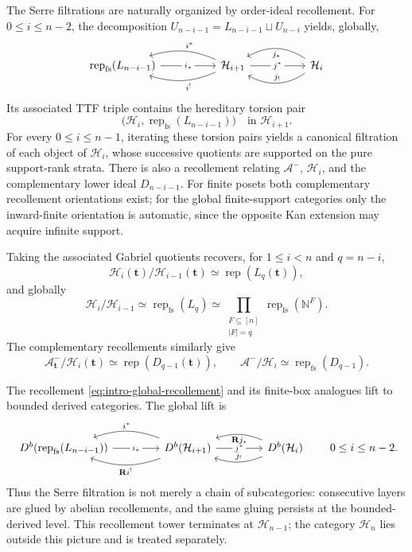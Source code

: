 \documentclass[12pt,reqno]{amsart}
\theoremstyle{definition}
\theoremstyle{remark}
\newcommand{\Rep}{\operatorname{rep}}
\begin{document}
The Serre filtrations are naturally organized by order-ideal recollement.
For $0\le i\le n-2$, the decomposition
$U_{n-i-1}=L_{n-i-1}\sqcup U_{n-i}$ yields, globally,
\begin{equation}\label{eq:intro-global-recollement}
\begin{tikzcd}[column sep=5.0em]
\Rep_{\mathrm{fs}}(L_{n-i-1})
  \arrow[r, "i_*" description]
& \mathcal H_{i+1}
  \arrow[l, bend right=20, "i^*"']
  \arrow[l, bend left=20, "i^!"]
  \arrow[r, "j^*" description]
& \mathcal H_i
  \arrow[l, bend left=32, "j_!"']
  \arrow[l, bend right=32, "j_*"]
\end{tikzcd}
\end{equation}
Its associated TTF triple contains the hereditary torsion pair
\[
\bigl(\mathcal H_i,\Rep_{\mathrm{fs}}(L_{n-i-1})\bigr)
\quad\text{in }\mathcal H_{i+1}.
\]
For every $0\le i\le n-1$, iterating these torsion pairs yields a canonical
filtration of each object of $\mathcal H_i$, whose successive quotients are
supported on the pure support-rank strata.  There is also a recollement relating $\mathcal A^-$,
$\mathcal H_i$, and the complementary lower ideal $D_{n-i-1}$.
For finite posets both complementary recollement orientations exist; for the
global finite-support categories only the inward-finite orientation is
automatic, since the opposite Kan extension may acquire infinite support.

Taking the associated Gabriel quotients recovers, for $1\le i<n$ and
$q=n-i$,
\begin{equation}\label{eq:intro-quotient}
\mathcal H_i(\mathbf t)/\mathcal H_{i-1}(\mathbf t)
\simeq\Rep(L_q(\mathbf t)),
\end{equation}
and globally
\[
\mathcal H_i/\mathcal H_{i-1}
\simeq\Rep_{\mathrm{fs}}(L_q)
\simeq
\prod_{\substack{F\subseteq[n]\\|F|=q}}
\Rep_{\mathrm{fs}}(\mathbb N^F).
\]
The complementary recollements similarly give
\[
\mathcal A^-_{\mathbf t}/\mathcal H_i(\mathbf t)
\simeq\Rep(D_{q-1}(\mathbf t)),
\qquad
\mathcal A^-/\mathcal H_i
\simeq\Rep_{\mathrm{fs}}(D_{q-1}).
\]

The recollement \eqref{eq:intro-global-recollement} and its finite-box analogues
lift to bounded derived categories.  The global lift is
\begin{equation}\label{eq:intro-derived-recollement}
\begin{tikzcd}[column sep=4.2em]
D^b\!\left(\Rep_{\mathrm{fs}}(L_{n-i-1})\right)
  \arrow[r, "i_*" description]
& D^b(\mathcal H_{i+1})
  \arrow[l, bend right=20, "i^*"']
  \arrow[l, bend left=20, "\mathbf R i^!"]
  \arrow[r, "j^*" description]
& D^b(\mathcal H_i)
  \arrow[l, bend left=20, "j_!"']
  \arrow[l, bend right=20, "\mathbf R j_*"]
\end{tikzcd}
\qquad 0\le i\le n-2.
\end{equation}
Thus the Serre filtration is not merely a chain of subcategories: consecutive
layers are glued by abelian recollements, and the same gluing persists at the
bounded-derived level.  This recollement tower terminates at
$\mathcal H_{n-1}$; the category $\mathcal H_n$ lies outside this picture and
is treated separately.
\end{document}
